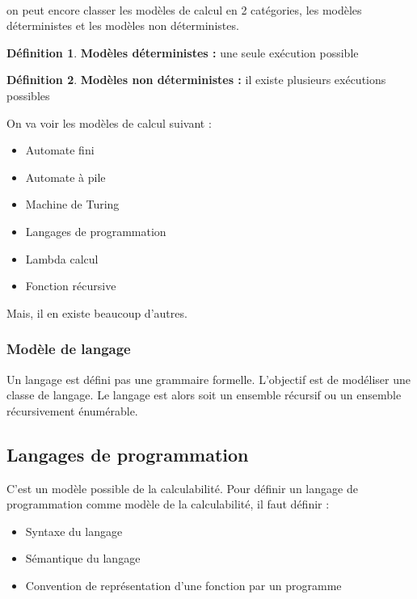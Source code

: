 \documentclass[11pt,a4paper]{article}
\theoremstyle{definition}
\newtheorem{mydef}{Définition}
\begin{document}
\paragraph{} on peut encore classer les modèles de calcul en 2 catégories, les 
modèles déterministes et les modèles non déterministes.

\begin{mydef}
	\textbf{Modèles déterministes :} une seule exécution possible
\end{mydef}

\begin{mydef}
	\textbf{Modèles non déterministes :} il existe plusieurs exécutions 
	possibles
\end{mydef}

On va voir les modèles de calcul suivant : 
\begin{itemize}
	\item Automate fini
	\item Automate à pile
	\item Machine de Turing
	\item Langages de programmation
	\item Lambda calcul
	\item Fonction récursive
\end{itemize}

Mais, il en existe beaucoup d'autres.

\subsubsection{Modèle de langage}
\label{ssub:mod_le_de_langage}
Un langage est défini pas une grammaire formelle. L'objectif est de modéliser 
une classe de langage. Le langage est alors soit un ensemble récursif ou un 
ensemble récursivement énumérable.


\subsection{Langages de programmation}
\label{sub:langages_de_programmation}
C'est un modèle possible de la calculabilité. Pour définir un langage de 
programmation comme modèle de la calculabilité, il faut définir : 
\begin{itemize}
	\item Syntaxe du langage
	\item Sémantique du langage
	\item Convention de représentation d'une fonction par un programme
\end{itemize}
\end{document}
